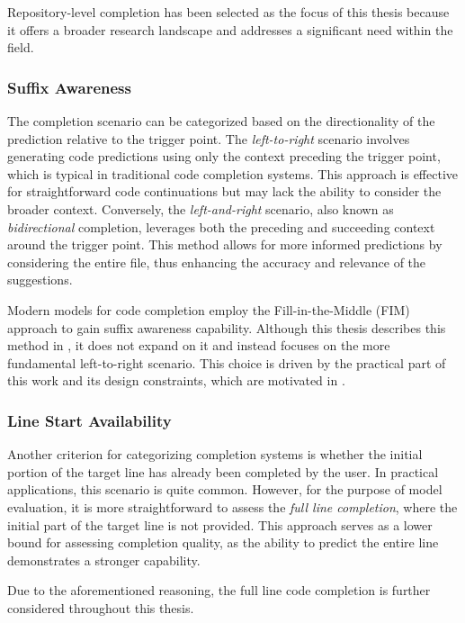 Repository-level completion has been selected as the focus of this thesis because it offers a broader research landscape and addresses a significant need within the field.

\subsubsection*{Suffix Awareness}

The completion scenario can be categorized based on the directionality of the prediction relative to the trigger point. The \textit{left-to-right} scenario involves generating code predictions using only the context preceding the trigger point, which is typical in traditional code completion systems. This approach is effective for straightforward code continuations but may lack the ability to consider the broader context. Conversely, the \textit{left-and-right} scenario, also known as \textit{bidirectional} completion, leverages both the preceding and succeeding context around the trigger point. This method allows for more informed predictions by considering the entire file, thus enhancing the accuracy and relevance of the suggestions.

Modern models for code completion employ the Fill-in-the-Middle (FIM) approach to gain suffix awareness capability. Although this thesis describes this method in , it does not expand on it and instead focuses on the more fundamental left-to-right scenario. This choice is driven by the practical part of this work and its design constraints, which are motivated in .

\subsubsection*{Line Start Availability}

Another criterion for categorizing completion systems is whether the initial portion of the target line has already been completed by the user. In practical applications, this scenario is quite common. However, for the purpose of model evaluation, it is more straightforward to assess the \textit{full line completion}, where the initial part of the target line is not provided. This approach serves as a lower bound for assessing completion quality, as the ability to predict the entire line demonstrates a stronger capability.

Due to the aforementioned reasoning, the full line code completion is further considered throughout this thesis.

